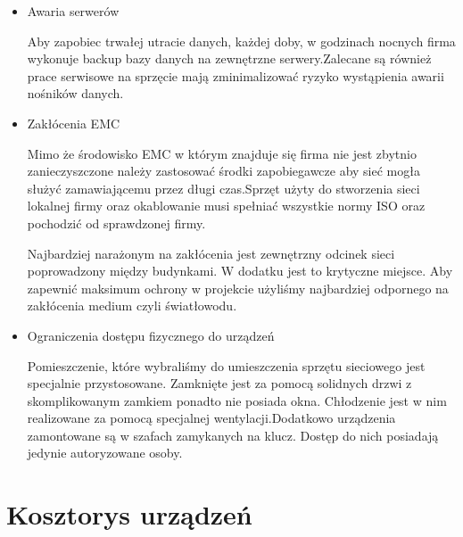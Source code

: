 \documentclass{report}
\begin{document}
\begin{itemize}
\item {Awaria serwerów}

Aby zapobiec trwałej utracie danych, każdej doby, w godzinach nocnych firma wykonuje backup bazy danych na
zewnętrzne serwery.Zalecane są również prace serwisowe na  sprzęcie
mają zminimalizować ryzyko wystąpienia awarii nośników danych.

\item {Zakłócenia EMC}

Mimo że środowisko EMC w którym znajduje się firma nie jest zbytnio zanieczyszczone należy zastosować środki zapobiegawcze
aby sieć mogła służyć zamawiającemu przez długi czas.Sprzęt użyty do
stworzenia sieci lokalnej firmy oraz okablowanie musi spełniać wszystkie normy ISO
oraz pochodzić od sprawdzonej firmy.

Najbardziej narażonym na zakłócenia jest zewnętrzny odcinek sieci poprowadzony między budynkami. W dodatku jest to krytyczne miejsce. 
Aby zapewnić maksimum ochrony w projekcie użyliśmy najbardziej odpornego na zakłócenia medium czyli światłowodu.


\item {Ograniczenia dostępu fizycznego do urządzeń}

Pomieszczenie, które wybraliśmy do umieszczenia sprzętu sieciowego jest specjalnie przystosowane.
Zamknięte jest za pomocą solidnych drzwi z skomplikowanym zamkiem ponadto nie posiada okna. Chłodzenie jest w nim
realizowane za pomocą specjalnej wentylacji.Dodatkowo urządzenia zamontowane są w szafach zamykanych na klucz. 
Dostęp do nich posiadają jedynie autoryzowane osoby.

\end{itemize}

\section{Kosztorys urządzeń}


 
\end{document}
